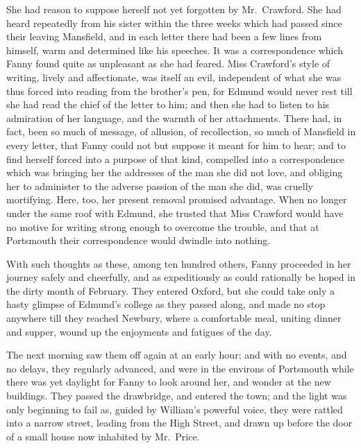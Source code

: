 She had reason to suppose herself not yet forgotten by
Mr.\ Crawford.  She had heard repeatedly from his sister within
the three weeks which had passed since their leaving Mansfield,
and in each letter there had been a few lines from himself,
warm and determined like his speeches.  It was a correspondence
which Fanny found quite as unpleasant as she had feared.
Miss Crawford's style of writing, lively and affectionate,
was itself an evil, independent of what she was thus
forced into reading from the brother's pen, for Edmund
would never rest till she had read the chief of the letter
to him; and then she had to listen to his admiration
of her language, and the warmth of her attachments.
There had, in fact, been so much of message, of allusion,
of recollection, so much of Mansfield in every letter,
that Fanny could not but suppose it meant for him to hear;
and to find herself forced into a purpose of that kind,
compelled into a correspondence which was bringing her
the addresses of the man she did not love, and obliging
her to administer to the adverse passion of the man she did,
was cruelly mortifying.  Here, too, her present removal
promised advantage.  When no longer under the same roof
with Edmund, she trusted that Miss Crawford would have no
motive for writing strong enough to overcome the trouble,
and that at Portsmouth their correspondence would dwindle
into nothing.

With such thoughts as these, among ten hundred others,
Fanny proceeded in her journey safely and cheerfully,
and as expeditiously as could rationally be hoped
in the dirty month of February.  They entered Oxford,
but she could take only a hasty glimpse of Edmund's
college as they passed along, and made no stop anywhere
till they reached Newbury, where a comfortable meal,
uniting dinner and supper, wound up the enjoyments and
fatigues of the day.

The next morning saw them off again at an early hour;
and with no events, and no delays, they regularly advanced,
and were in the environs of Portsmouth while there was yet
daylight for Fanny to look around her, and wonder at the
new buildings.  They passed the drawbridge, and entered
the town; and the light was only beginning to fail as,
guided by William's powerful voice, they were rattled
into a narrow street, leading from the High Street,
and drawn up before the door of a small house now inhabited
by Mr.\ Price.

